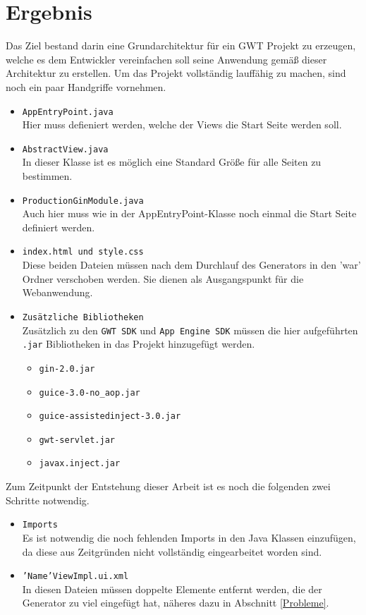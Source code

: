 \chapter{Ergebnis} \label{Ergebnis}
Das Ziel bestand darin eine Grundarchitektur für ein GWT Projekt zu erzeugen,
welche es dem Entwickler vereinfachen soll seine Anwendung gemäß dieser
Architektur zu erstellen.
Um das Projekt vollständig lauffähig zu machen, sind noch ein paar Handgriffe
vornehmen.

\begin{itemize}
  \item \texttt{AppEntryPoint.java} \\
  Hier muss defieniert werden, welche der Views die Start Seite werden soll.
  \item \texttt{AbstractView.java} \\
  In dieser Klasse ist es möglich eine Standard Größe für alle Seiten zu
  bestimmen.
  \item \texttt{ProductionGinModule.java} \\
  Auch hier muss wie in der AppEntryPoint-Klasse noch einmal die Start Seite
  definiert werden.
  \item \texttt{index.html und style.css} \\
  Diese beiden Dateien müssen nach dem Durchlauf des Generators in den 'war'
  Ordner verschoben werden. Sie dienen als Ausgangspunkt für die Webanwendung.
  \item \texttt{Zusätzliche Bibliotheken}\\
  	Zusätzlich zu den \texttt{GWT SDK} und \texttt{App Engine SDK} müssen die
    hier aufgeführten \texttt{.jar} Bibliotheken in das Projekt hinzugefügt
    werden.
  	\begin{itemize}
  	  \item \texttt{gin-2.0.jar}
  	  \item \texttt{guice-3.0-no\_aop.jar}
  	  \item \texttt{guice-assistedinject-3.0.jar}
  	  \item \texttt{gwt-servlet.jar}
  	  \item \texttt{javax.inject.jar}
	\end{itemize}
\end{itemize}
Zum Zeitpunkt der Entstehung dieser Arbeit ist es noch die folgenden
zwei Schritte notwendig.
\begin{itemize}
  \item \texttt{Imports} \\
  Es ist notwendig die noch fehlenden Imports in den Java Klassen
  einzufügen, da diese aus Zeitgründen nicht vollständig eingearbeitet worden
  sind. 
  \item \texttt{'Name'ViewImpl.ui.xml} \\
  In diesen Dateien müssen doppelte Elemente entfernt werden, die der Generator zu
  viel eingefügt hat, näheres dazu in Abschnitt \ref{Probleme}.
\end{itemize} 

